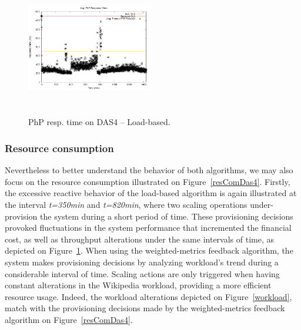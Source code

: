 \begin{figure}

\begin{center}
\includegraphics[width=0.49\textwidth, height=6cm]{./images/homogeneous/avgTimeout_PhP_naive}
\end{center}
\caption{PhP resp. time on DAS4 -- Load-based.}
\label{naiveDas4}
\end{figure}

\subsubsection{Resource consumption}

Nevertheless to better understand the behavior of both algorithms, we may also focus on the resource consumption illustrated on Figure~\ref{resComDas4}. Firstly, the excessive reactive behavior of the load-based algorithm is again illustrated at the interval \emph{t=350min} and \emph{t=820min}, where two scaling operations under-provision the system during a short period of time. These provisioning decisions provoked fluctuations in the system performance that incremented the financial cost, as well as throughput alterations under the same intervals of time, as depicted on Figure~\ref{naiveDas4}. When using the weighted-metrics feedback algorithm, the system makes provisioning decisions by analyzing workload's trend during a considerable interval of time. Scaling actions are only triggered when having constant alterations in the Wikipedia workload, providing a more efficient resource usage. Indeed, the workload alterations depicted on Figure~\ref{workload}, match with the provisioning decisions made by the weighted-metrics feedback algorithm on Figure~\ref{resComDas4}.

